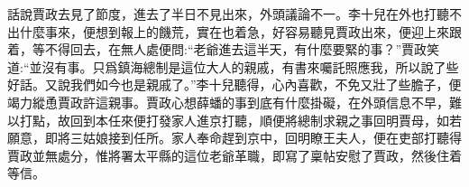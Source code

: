 


\begin{parag}
    話說賈政去見了節度，進去了半日不見出來，外頭議論不一。李十兒在外也打聽不出什麼事來，便想到報上的饑荒，實在也着急，好容易聽見賈政出來，便迎上來跟着，等不得回去，在無人處便問:“老爺進去這半天，有什麼要緊的事？”賈政笑道:“並沒有事。只爲鎮海總制是這位大人的親戚，有書來囑託照應我，所以說了些好話。又說我們如今也是親戚了。”李十兒聽得，心內喜歡，不免又壯了些膽子，便竭力縱恿賈政許這親事。賈政心想薛蟠的事到底有什麼掛礙，在外頭信息不早，難以打點，故回到本任來便打發家人進京打聽，順便將總制求親之事回明賈母，如若願意，即將三姑娘接到任所。家人奉命趕到京中，回明瞭王夫人，便在吏部打聽得賈政並無處分，惟將署太平縣的這位老爺革職，即寫了稟帖安慰了賈政，然後住着等信。
\end{parag}


